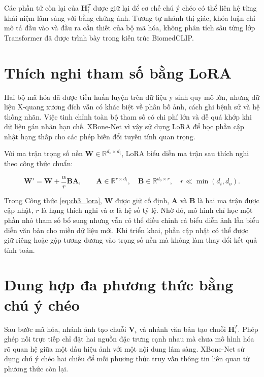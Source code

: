 Các phần tử còn lại của $\boldsymbol{H}_{i}^{T}$ được giữ lại để cơ chế chú ý chéo có thể liên hệ từng khái niệm lâm sàng với bằng chứng ảnh. Tương tự nhánh thị giác, khóa luận chỉ mô tả đầu vào và đầu ra cần thiết của bộ mã hóa, không phân tích sâu từng lớp Transformer đã được trình bày trong kiến trúc BiomedCLIP.

\section{Thích nghi tham số bằng LoRA}
\label{sec:ch3_lora}

Hai bộ mã hóa đã được tiền huấn luyện trên dữ liệu y sinh quy mô lớn, nhưng dữ liệu X-quang xương đích vẫn có khác biệt về phân bố ảnh, cách ghi bệnh sử và hệ thống nhãn. Việc tinh chỉnh toàn bộ tham số có chi phí lớn và dễ quá khớp khi dữ liệu gán nhãn hạn chế. XBone-Net vì vậy sử dụng LoRA để học phần cập nhật hạng thấp cho các phép biến đổi tuyến tính quan trọng.

Với ma trận trọng số nền $\boldsymbol{W}\in\mathbb{R}^{d_o\times d_i}$, LoRA biểu diễn ma trận sau thích nghi theo công thức chuẩn:

\begin{equation}
\boldsymbol{W}'
=
\boldsymbol{W}
+
\frac{\alpha}{r}
\boldsymbol{B}\boldsymbol{A},
\qquad
\boldsymbol{A}\in\mathbb{R}^{r\times d_i},
\quad
\boldsymbol{B}\in\mathbb{R}^{d_o\times r},
\quad
r\ll\min(d_i,d_o).
\label{eq:ch3_lora}
\end{equation}

Trong Công thức \ref{eq:ch3_lora}, $\boldsymbol{W}$ được giữ cố định, $\boldsymbol{A}$ và $\boldsymbol{B}$ là hai ma trận được cập nhật, $r$ là hạng thích nghi và $\alpha$ là hệ số tỷ lệ. Nhờ đó, mô hình chỉ học một phần nhỏ tham số bổ sung nhưng vẫn có thể điều chỉnh cả biểu diễn ảnh lẫn biểu diễn văn bản cho miền dữ liệu mới. Khi triển khai, phần cập nhật có thể được giữ riêng hoặc gộp tương đương vào trọng số nền mà không làm thay đổi kết quả tính toán.

\section{Dung hợp đa phương thức bằng chú ý chéo}
\label{sec:ch3_fusion}

Sau bước mã hóa, nhánh ảnh tạo chuỗi $\boldsymbol{V}_{i}$ và nhánh văn bản tạo chuỗi $\boldsymbol{H}_{i}^{T}$. Phép ghép nối trực tiếp chỉ đặt hai nguồn đặc trưng cạnh nhau mà chưa mô hình hóa rõ quan hệ giữa một dấu hiệu ảnh với một nội dung lâm sàng. XBone-Net sử dụng chú ý chéo hai chiều để mỗi phương thức truy vấn thông tin liên quan từ phương thức còn lại.

